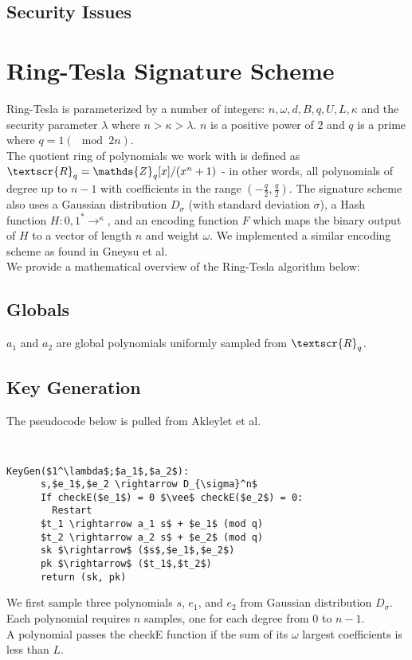 \documentclass[letterpaper,twocolumn,10pt]{article}
\begin{document}
\subsection{Security Issues}


\section{Ring-Tesla Signature Scheme}
Ring-Tesla is parameterized by a number of integers: $n, \omega, d, B, q, U, L, \kappa$ and the security parameter $\lambda$ where $n > \kappa > \lambda$. $n$ is a positive power of $2$ and $q$ is a prime where $q = 1 (\mod 2n)$. \\
The quotient ring of polynomials we work with is defined as $\textscr{R}_q = \mathds{Z}_q[x] / (x^n + 1)$ - in other words, all polynomials of degree up to $n-1$ with coefficients in the range $(-\frac{q}{2}, \frac{q}{2})$.
The signature scheme also uses a Gaussian distribution $D_{\sigma}$ (with standard deviation $\sigma$), a Hash function $H : {0, 1}^* \rightarrow ^\kappa$, and an encoding function $F$ which maps the binary output of $H$ to a vector of length $n$ and weight $\omega$. We implemented a similar encoding scheme as found in Gneysu et al. \cite{encoding}\\

We provide a mathematical overview of the Ring-Tesla algorithm below:

\subsection{Globals}
$a_1$ and $a_2$ are global polynomials uniformly sampled from $\textscr{R}_q$.

\subsection{Key Generation}
The pseudocode below is pulled from Akleylet et al. \cite{rTesla}
{\tt \small
  \begin{lstlisting}[mathescape, columns=flexible]
    KeyGen($1^\lambda$;$a_1$,$a_2$):
      s,$e_1$,$e_2 \rightarrow D_{\sigma}^n$ 
      If checkE($e_1$) = 0 $\vee$ checkE($e_2$) = 0:
        Restart
      $t_1 \rightarrow a_1 s$ + $e_1$ (mod q) 
      $t_2 \rightarrow a_2 s$ + $e_2$ (mod q) 
      sk $\rightarrow$ ($s$,$e_1$,$e_2$)
      pk $\rightarrow$ ($t_1$,$t_2$)
      return (sk, pk)
  \end{lstlisting} 
}

We first sample three polynomials $s$, $e_1$, and $e_2$ from Gaussian distribution $D_{\sigma}$. Each polynomial requires $n$ samples, one for each degree from $0$ to $n-1$.\\
A polynomial passes the checkE function if the sum of its $\omega$ largest coefficients is less than $L$.\\
\end{document}
